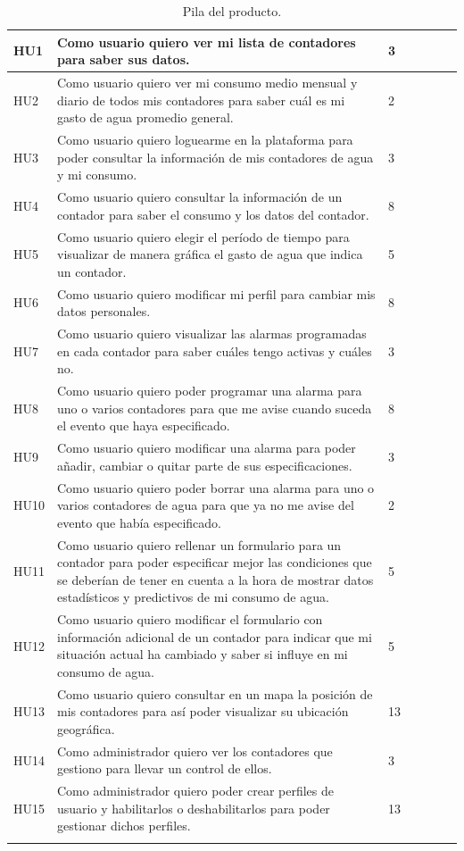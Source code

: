 \documentclass[pdftex,11pt,a4paper]{book}
\begin{document}
\begin{center}
\begin{longtable}{|>{\centering\arraybackslash}X m{}|m{}|>{\centering\arraybackslash}X m{}|>{\centering\arraybackslash}X m{}|}
HU1 & Como usuario quiero ver mi lista de contadores para saber sus datos. & 3 & 1 \\ \hline
HU2 & Como usuario quiero ver mi consumo medio mensual y diario de todos mis contadores para saber cuál es mi gasto de agua promedio general. & 2 & 3 \\ \hline
HU3 & Como usuario quiero loguearme en la plataforma para poder consultar la información de mis contadores de agua y mi consumo. & 3 & 2 \\ \hline
HU4 & Como usuario quiero consultar la información de un contador para saber el consumo y los datos del contador. & 8 & 4 \\ \hline
HU5 & Como usuario quiero elegir el período de tiempo para visualizar de manera gráfica el gasto de agua que indica un contador. & 5 & 5 \\ \hline
HU6 & Como usuario quiero modificar mi perfil para cambiar mis datos personales. & 8 & 6 \\ \hline
HU7 & Como usuario quiero visualizar las alarmas programadas en cada contador para saber cuáles tengo activas y cuáles no. & 3 & 7 \\ \hline
HU8 & Como usuario quiero poder programar una alarma para uno o varios contadores para que me avise cuando suceda el evento que haya especificado. & 8 & 8 \\ \hline
HU9 & Como usuario quiero modificar una alarma para poder añadir, cambiar o quitar parte de sus especificaciones. & 3 & 10 \\ \hline
HU10 & Como usuario quiero poder borrar una alarma para uno o varios contadores de agua para que ya no me avise del evento que había especificado. & 2 & 9 \\ \hline
HU11 & Como usuario quiero rellenar un formulario para un contador para poder especificar mejor las condiciones que se deberían de tener en cuenta a la hora de mostrar datos estadísticos y predictivos de mi consumo de agua. & 5 & 11 \\ \hline
HU12 & Como usuario quiero modificar el formulario con información adicional de un contador para indicar que mi situación actual ha cambiado y saber si influye en mi consumo de agua. & 5 & 12 \\ \hline
HU13 & Como usuario quiero consultar en un mapa la posición de mis contadores para así poder visualizar su ubicación geográfica. & 13 & 13 \\ \hline
HU14 & Como administrador quiero ver los contadores que gestiono para llevar un control de ellos. & 3 & 15 \\ \hline
HU15 & Como administrador quiero poder crear perfiles de usuario y habilitarlos o deshabilitarlos para poder gestionar dichos perfiles. & 13 & 14 \\ \hline
\caption{Pila del producto.} \label{tablalarga:tablaHU}
\end{longtable}
\end{center}
\end{document}
